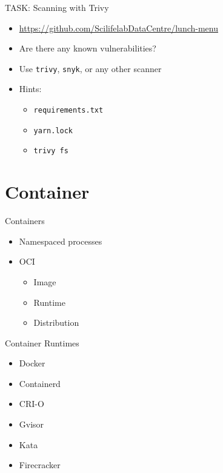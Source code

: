 \documentclass{dcpresentation}
\begin{document}
\begin{frame}{TASK: Scanning with Trivy}
  \begin{itemize}
  \item \url{https://github.com/ScilifelabDataCentre/lunch-menu}
  \item Are there any known vulnerabilities?
  \item Use \texttt{trivy}, \texttt{snyk}, or any other scanner
  \item Hints:
    \begin{itemize}
    \item \texttt{requirements.txt}
    \item \texttt{yarn.lock}
    \item \texttt{trivy fs}
    \end{itemize}
  \end{itemize}
\end{frame}

\section{Container}

\begin{frame}
\end{frame}

\begin{frame}
\end{frame}

\begin{frame}{Containers}
  \begin{itemize}
  \item Namespaced processes
  \item OCI
    \begin{itemize}
    \item Image
    \item Runtime
    \item Distribution
    \end{itemize}
  \end{itemize}
\end{frame}



\begin{frame}{Container Runtimes}
  \begin{itemize}
  \item Docker
  \item Containerd
  \item CRI-O
  \item Gvisor
  \item Kata
  \item Firecracker
  \end{itemize}
\end{frame}
\end{document}
